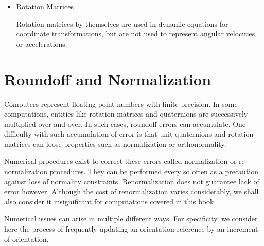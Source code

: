 \begin{itemize}
  \item Rotation Matrices

Rotation matrices by themselves are used in dynamic equations for coordinate transformations, but are not used to represent angular velocities or accelerations.


\end{itemize}





\section{Roundoff and Normalization}

Computers represent floating point numbers with finite precision.  In some computations, entities like rotation matrices and quaternions are successively multiplied over and over.  In such cases, roundoff errors can accumulate.  One difficulty with such accumulation of error is that unit quaternions and rotation matrices can loose properties such as normalization or orthonormality.

Numerical procedures exist to correct these errors called normalization or re-normalization procedures.  They can be performed every so often as a precaution against loss of normality constraints.  Renormalization does not guarantee lack of error however.   Although the cost of renormalization varies considerably, we shall also consider it insignificant for computations covered in this book.


Numerical issues can arise in multiple different ways.  For specificity, we consider here the process of frequently updating an orientation reference by an increment of orientation.

